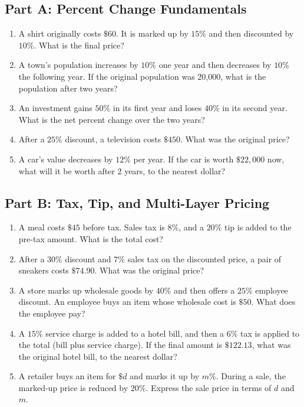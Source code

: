 \documentclass[14pt]{extarticle}
\begin{document}
\subsection*{Part A: Percent Change Fundamentals}
\begin{enumerate}
  \item A shirt originally costs \(\$60\). It is marked up by \(15\%\) and then discounted by \(10\%\). What is the final price?
  \item A town's population increases by \(10\%\) one year and then decreases by \(10\%\) the following year. If the original population was 20{,}000, what is the population after two years?
  \item An investment gains \(50\%\) in its first year and loses \(40\%\) in its second year. What is the net percent change over the two years?
  \item After a \(25\%\) discount, a television costs \(\$450\). What was the original price?
  \item A car's value decreases by \(12\%\) per year. If the car is worth \(\$22{,}000\) now, what will it be worth after 2 years, to the nearest dollar?
\end{enumerate}

\subsection*{Part B: Tax, Tip, and Multi-Layer Pricing}
\begin{enumerate}
  \item A meal costs \(\$45\) before tax. Sales tax is \(8\%\), and a \(20\%\) tip is added to the pre-tax amount. What is the total cost?
  \item After a \(30\%\) discount and \(7\%\) sales tax on the discounted price, a pair of sneakers costs \(\$74.90\). What was the original price?
  \item A store marks up wholesale goods by \(40\%\) and then offers a \(25\%\) employee discount. An employee buys an item whose wholesale cost is \(\$50\). What does the employee pay?
  \item A \(15\%\) service charge is added to a hotel bill, and then a \(6\%\) tax is applied to the total (bill plus service charge). If the final amount is \(\$122.13\), what was the original hotel bill, to the nearest dollar?
  \item A retailer buys an item for \(\$d\) and marks it up by \(m\%\). During a sale, the marked-up price is reduced by \(20\%\). Express the sale price in terms of \(d\) and \(m\).
\end{enumerate}
\end{document}
